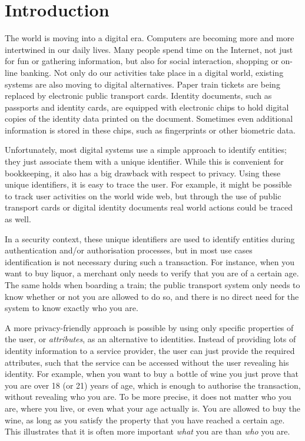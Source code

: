 \chapter{Introduction}

The world is moving into a digital era. Computers are becoming more and more
intertwined in our daily lives. Many people spend time on the Internet, not just
for fun or gathering information, but also for social interaction, shopping or
on-line banking. Not only do our activities take place in a digital world,
existing systems are also moving to digital alternatives. Paper train tickets
are being replaced by electronic public transport cards. Identity documents,
such as passports and identity cards, are equipped with electronic chips to hold
digital copies of the identity data printed on the document. Sometimes even
additional information is stored in these chips, such as fingerprints or other
biometric data.

Unfortunately, most digital systems use a simple approach to identify entities;
they just associate them with a unique identifier. While this is convenient for
bookkeeping, it also has a big drawback with respect to privacy. Using these
unique identifiers, it is easy to trace the user. For example, it might be
possible to track user activities on the world wide web, but through the use of
public transport cards or digital identity documents real world actions could be
traced as well.

In a security context, these unique identifiers are used to identify entities
during authentication and/or authorisation processes, but in most use cases
identification is not necessary during such a transaction. For instance, when
you want to buy liquor, a merchant only needs to verify that you are of a
certain age. The same holds when boarding a train; the public transport system
only needs to know whether or not you are allowed to do so, and there is no
direct need for the system to know exactly who you are.

A more privacy-friendly approach is possible by using only specific properties
of the user, or \emph{attributes}, as an alternative to identities. Instead of
providing lots of identity information to a service provider, the user can just
provide the required attributes, such that the service can be accessed without
the user revealing his identity. For example, when you want to buy a bottle of
wine you just prove that you are over 18 (or 21) years of age, which is enough
to authorise the transaction, without revealing who you are. To be more precise,
it does not matter who you are, where you live, or even what your age actually
is. You are allowed to buy the wine, as long as you satisfy the property that
you have reached a certain age. This illustrates that it is often more important
\emph{what} you are than \emph{who} you are.

